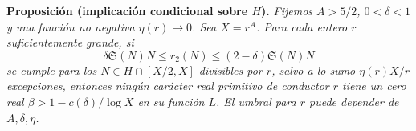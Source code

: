\documentclass[11pt,a4paper]{article}
\newcommand{\B}[2]{#2}
\newcommand{\B}[2]{#1}
\newcommand{\Sg}{\mathfrak S}
\begin{document}
\noindent\textbf{\B{Proposition (conditional implication on $H$).}{Proposición (implicación condicional sobre $H$).}}
\emph{\B{Fix $A>5/2$, $0<\delta<1$, and any nonnegative function $\eta(r)\to0$. Put $X=r^A$. For each sufficiently large integer $r$, if}{Fijemos $A>5/2$, $0<\delta<1$ y una función no negativa $\eta(r)\to0$. Sea $X=r^A$. Para cada entero $r$ suficientemente grande, si}}
\begin{equation}\label{eq:siegelband}
 \delta\Sg(N)N\le r_2(N)\le(2-\delta)\Sg(N)N
\end{equation}
\emph{\B{holds at all $N\in H\cap[X/2,X]$ divisible by $r$, apart from at most $\eta(r)X/r$ exceptions, then no primitive real character of conductor $r$ has a real $L$-zero $\beta>1-c(\delta)/\log X$. The threshold for $r$ may depend on $A,\delta,\eta$.}{se cumple para los $N\in H\cap[X/2,X]$ divisibles por $r$, salvo a lo sumo $\eta(r)X/r$ excepciones, entonces ningún carácter real primitivo de conductor $r$ tiene un cero real $\beta>1-c(\delta)/\log X$ en su función $L$. El umbral para $r$ puede depender de $A,\delta,\eta$.}}
\end{document}
